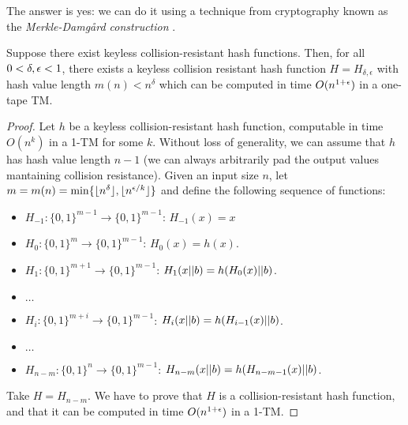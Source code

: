 The answer is yes: we can do it using a technique from cryptography known as the \emph{Merkle-Damgård construction} \cite{Merkle90, Damgard90}.

\begin{theorem}
\label{thm:hashonetape}
Suppose there exist keyless collision-resistant hash functions. Then, for all $0 < \delta, \epsilon < 1$, there exists a keyless collision resistant hash
function $H = H_{\delta, \epsilon}$ with hash value length $m(n) < n^\delta$ which can be computed in time $O(n^{1+\epsilon})$ in a one-tape
TM.
\end{theorem}

\begin{proof}
Let $h$ be a keyless collision-resistant hash function, computable in time $O(n^k)$ in a 1-TM for some $k$.
Without loss of generality, we can assume that $h$ has hash value length $n-1$ (we can always arbitrarily
pad the output values mantaining collision resistance). Given an input size $n$, 
let $m = m(n) = \min\{\lfloor n^\delta \rfloor,  \lfloor n^{\epsilon/k} \rfloor \}$ and define the following sequence of functions:


\begin{itemize}
    \item[] $H_{-1} \colon \{0, 1\}^{m-1} \to \{0, 1\}^{m-1}$: $H_{-1}(x) = x$
    \item[] $H_0 \colon \{0, 1\}^m \to \{0, 1\}^{m-1}$: $H_0(x) = h(x)$.
    \item[] $H_1 \colon \{0, 1\}^{m+1} \to \{0, 1\}^{m-1}$: $H_1(x || b) = h(H_0(x) || b)$.
    \item[] $\dots$
    \item[] $H_i \colon \{0, 1\}^{m+i} \to \{0, 1\}^{m-1}$: $H_i(x || b) = h(H_{i-1}(x) || b)$.
    \item[] $\dots$
    \item[] $H_{n-m} \colon \{0, 1\}^{n} \to \{0, 1\}^{m-1}$: $H_{n-m}(x || b) = h(H_{n-m-1}(x) || b)$.
\end{itemize}



Take $H = H_{n-m}$. We have to prove that $H$ is a collision-resistant hash function, and that it can be
computed in time $O(n^{1+\epsilon})$ in a 1-TM. 


\end{proof}
